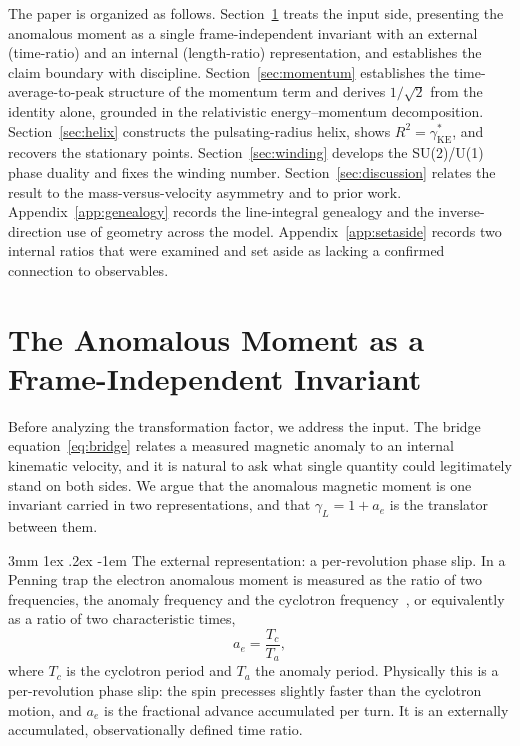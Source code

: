 \documentclass[%
 reprint, amsmath,amssymb, aps, prb, ]{revtex4-2}
\makeatletter
\numberwithin{equation}{section}
\renewcommand\paragraph{%
  \@startsection{paragraph}{4}{\z@}%
    {3mm \@plus 1ex \@minus .2ex}%
    {-1em}%
    {\normalfont\normalsize\itshape}}
\newcommand{\gKE}{\gamma^{*}_{\text{KE}}}
\makeatother
\begin{document}
The paper is organized as follows. Section~\ref{sec:duality-rep} treats the input side, presenting the anomalous moment as a single frame-independent invariant with an external (time-ratio) and an internal (length-ratio) representation, and establishes the claim boundary with discipline. Section~\ref{sec:momentum} establishes the time-average-to-peak structure of the momentum term and derives $1/\sqrt{2}$ from the identity alone, grounded in the relativistic energy--momentum decomposition. Section~\ref{sec:helix} constructs the pulsating-radius helix, shows $R^2=\gKE$, and recovers the stationary points. Section~\ref{sec:winding} develops the SU(2)/U(1) phase duality and fixes the winding number. Section~\ref{sec:discussion} relates the result to the mass-versus-velocity asymmetry and to prior work. Appendix~\ref{app:genealogy} records the line-integral genealogy and the inverse-direction use of geometry across the model. Appendix~\ref{app:setaside} records two internal ratios that were examined and set aside as lacking a confirmed connection to observables.

\section{The Anomalous Moment as a Frame-Independent Invariant}
\label{sec:duality-rep}

Before analyzing the transformation factor, we address the input. The bridge equation~\eqref{eq:bridge} relates a measured magnetic anomaly to an internal kinematic velocity, and it is natural to ask what single quantity could legitimately stand on both sides. We argue that the anomalous magnetic moment is one invariant carried in two representations, and that $\gamma_L = 1 + a_e$ is the translator between them.

\paragraph{The external representation: a per-revolution phase slip.}
In a Penning trap the electron anomalous moment is measured as the ratio of two frequencies, the anomaly frequency and the cyclotron frequency~\cite{codata2022}, or equivalently as a ratio of two characteristic times,
\begin{equation}
a_e = \frac{T_c}{T_a},
\label{eq:ae-external}
\end{equation}
where $T_c$ is the cyclotron period and $T_a$ the anomaly period. Physically this is a per-revolution phase slip: the spin precesses slightly faster than the cyclotron motion, and $a_e$ is the fractional advance accumulated per turn. It is an externally accumulated, observationally defined time ratio.
\end{document}

